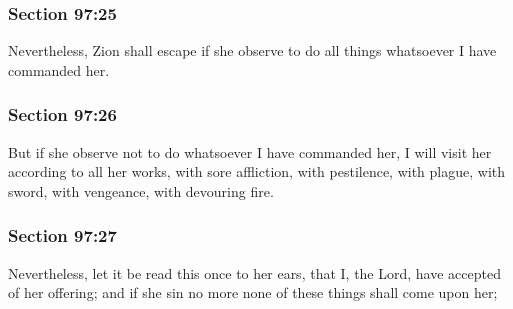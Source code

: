 	\subsubsection{Section 97:25} %
		\label{DC97-25}

		Nevertheless, Zion shall escape if she observe to do all things whatsoever I have commanded her.


	\subsubsection{Section 97:26} %
		\label{DC97-26}

		But if she observe not to do whatsoever I have commanded her, I will visit her according to all her works, with sore affliction, with pestilence, with plague, with sword, with vengeance, with devouring fire.


	\subsubsection{Section 97:27} %
		\label{DC97-27}

		Nevertheless, let it be read this once to her ears, that I, the Lord, have accepted of her offering; and if she sin no more none of these things shall come upon her;



